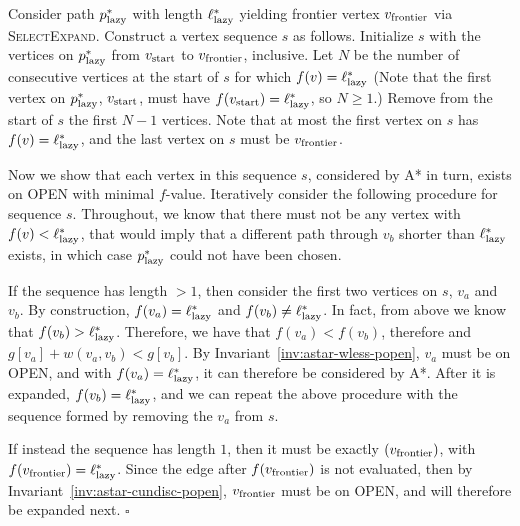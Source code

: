 \documentclass[nobib]{tufte-book}
\newcommand{\ms}[1]{\mbox{\scriptsize #1}}
\newenvironment{proof}[1][Proof]{\begin{trivlist}
   \item[\hskip \labelsep {\bfseries #1}]}{\hfill$\square$\end{trivlist}}
\begin{document}
\begin{proof}[Proof of Theorem \ref{thm:astar-equiv-from-lazy}]
Consider path $p^*_{\ms{lazy}}$ with length $\ell^*_{\ms{lazy}}$
yielding frontier vertex $v_{\ms{frontier}}$ via \textsc{SelectExpand}.
Construct a vertex sequence $s$ as follows.
Initialize $s$ with the vertices on $p^*_{\ms{lazy}}$
from $v_{\ms{start}}$ to $v_{\ms{frontier}}$, inclusive.
Let $N$ be the number of consecutive vertices at the start of $s$
for which $f(v) = \ell^*_{\ms{lazy}}$
(Note that the first vertex on $p^*_{\ms{lazy}}$, $v_{\ms{start}}$,
must have $f(v_{\ms{start}}) = \ell^*_{\ms{lazy}}$,
so $N \geq 1$.)
Remove from the start of $s$ the first $N-1$ vertices.
Note that at most the first vertex on $s$ has
$f(v) = \ell^*_{\ms{lazy}}$,
and the last vertex on $s$ must be $v_{\ms{frontier}}$.

Now we show that each vertex in this sequence $s$,
considered by A* in turn,
exists on OPEN with minimal $f$-value.
Iteratively consider the following procedure for sequence $s$.
Throughout,
we know that there must not be any vertex with
$f(v) < \ell^*_{\ms{lazy}}$,
that would imply that a different path through $v_b$ shorter than
$\ell^*_{\ms{lazy}}$ exists,
in which case $p^*_{\ms{lazy}}$ could not have been chosen.

If the sequence has length $>1$,
then consider the first two vertices on $s$, $v_a$ and $v_b$.
By construction,
$f(v_a) = \ell^*_{\ms{lazy}}$
and 
$f(v_b) \neq \ell^*_{\ms{lazy}}$.
In fact, from above
we know that $f(v_b) > \ell^*_{\ms{lazy}}$.
Therefore,
we have that $f(v_a) < f(v_b)$,
therefore and $g[v_a] + w(v_a,v_b) < g[v_b]$.
By Invariant~\ref{inv:astar-wless-popen},
$v_a$ must be on OPEN,
and with $f(v_a) = \ell^*_{\ms{lazy}}$,
it can therefore be considered by A*.
After it is expanded,
$f(v_b) = \ell^*_{\ms{lazy}}$,
and we can repeat the above procedure
with the sequence formed by removing the $v_a$ from $s$.

If instead the sequence has length $1$,
then it must be exactly $(v_{\ms{frontier}})$,
with $f(v_{\ms{frontier}}) = \ell^*_{\ms{lazy}}$.
Since the edge after $f(v_{\ms{frontier}})$ is not
evaluated,
then by Invariant~\ref{inv:astar-cundisc-popen},
$v_{\ms{frontier}}$ must be on OPEN,
and will therefore be expanded next.
\end{proof}
\end{document}
